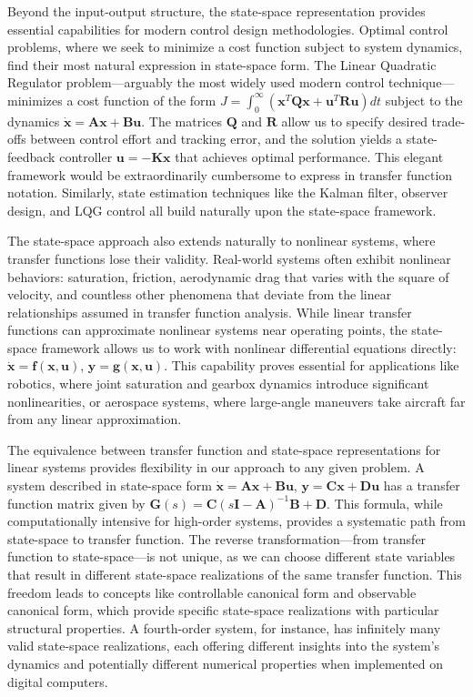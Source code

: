 Beyond the input-output structure, the state-space representation provides essential capabilities for modern control design methodologies. Optimal control problems, where we seek to minimize a cost function subject to system dynamics, find their most natural expression in state-space form. The Linear Quadratic Regulator problem—arguably the most widely used modern control technique—minimizes a cost function of the form $J = \int_0^\infty \left(\mathbf{x}^T\mathbf{Q}\mathbf{x} + \mathbf{u}^T\mathbf{R}\mathbf{u}\right)dt$ subject to the dynamics $\dot{\mathbf{x}} = \mathbf{A}\mathbf{x} + \mathbf{B}\mathbf{u}$. The matrices $\mathbf{Q}$ and $\mathbf{R}$ allow us to specify desired trade-offs between control effort and tracking error, and the solution yields a state-feedback controller $\mathbf{u} = -\mathbf{K}\mathbf{x}$ that achieves optimal performance. This elegant framework would be extraordinarily cumbersome to express in transfer function notation. Similarly, state estimation techniques like the Kalman filter, observer design, and LQG control all build naturally upon the state-space framework.

The state-space approach also extends naturally to nonlinear systems, where transfer functions lose their validity. Real-world systems often exhibit nonlinear behaviors: saturation, friction, aerodynamic drag that varies with the square of velocity, and countless other phenomena that deviate from the linear relationships assumed in transfer function analysis. While linear transfer functions can approximate nonlinear systems near operating points, the state-space framework allows us to work with nonlinear differential equations directly: $\dot{\mathbf{x}} = \mathbf{f}(\mathbf{x}, \mathbf{u})$, $\mathbf{y} = \mathbf{g}(\mathbf{x}, \mathbf{u})$. This capability proves essential for applications like robotics, where joint saturation and gearbox dynamics introduce significant nonlinearities, or aerospace systems, where large-angle maneuvers take aircraft far from any linear approximation.

The equivalence between transfer function and state-space representations for linear systems provides flexibility in our approach to any given problem. A system described in state-space form $\dot{\mathbf{x}} = \mathbf{A}\mathbf{x} + \mathbf{B}\mathbf{u}$, $\mathbf{y} = \mathbf{C}\mathbf{x} + \mathbf{D}\mathbf{u}$ has a transfer function matrix given by $\mathbf{G}(s) = \mathbf{C}(s\mathbf{I} - \mathbf{A})^{-1}\mathbf{B} + \mathbf{D}$. This formula, while computationally intensive for high-order systems, provides a systematic path from state-space to transfer function. The reverse transformation—from transfer function to state-space—is not unique, as we can choose different state variables that result in different state-space realizations of the same transfer function. This freedom leads to concepts like controllable canonical form and observable canonical form, which provide specific state-space realizations with particular structural properties. A fourth-order system, for instance, has infinitely many valid state-space realizations, each offering different insights into the system's dynamics and potentially different numerical properties when implemented on digital computers.

